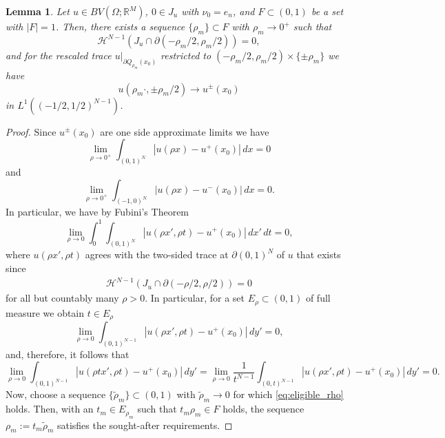 \documentclass[a4paper, 11pt, reqno]{amsart}
\theoremstyle{plain}
\newtheorem{lemma}[theorem]{Lemma}
\theoremstyle{definition}
\theoremstyle{remark}
\newcommand{\R}{\mathbb R}
\renewcommand{\H}{\mathcal H}
\begin{document}
    \begin{lemma}\label{lemma:technical_approx_limits}
        Let $u \in BV(\Omega; \R^M)$, $0 \in J_u$ with $\nu_{0} = e_n$, and $F \subset (0,1)$ be a set with $|F| = 1$. Then, there exists a sequence $\{\rho_m\} \subset F$ with $\rho_m \to 0^+$ such that 
        \[
            \H^{N-1}(J_u \cap \partial (-\rho_m/2, \rho_m/2)) = 0,
        \]
        and for the rescaled trace $u|_{\partial Q_{\rho_m}(x_0)}$ restricted to $(-\rho_m/2, \rho_m/2)\times \{\pm \rho_m\}$ we have 
        \[
            u(\rho_m \cdot, \pm \rho_m/2) \to u^\pm(x_0)
        \]
        in $L^1((-1/2, 1/2)^{N-1})$.
    \end{lemma}
    
    \begin{proof}
        Since $u^\pm(x_0)$ are one side approximate limits we have 
        \[
            \lim_{\rho \to 0^+} \int_{(0, 1)^N} |u(\rho x) - u^+(x_0)| \, dx = 0
        \]
        and
        \[
            \lim_{\rho \to 0^+} \int_{(-1, 0)^N} |u(\rho x) - u^-(x_0)| \, dx = 0.
        \]
        In particular, we have by Fubini's Theorem
        \[
            \lim_{\rho \to 0} \int_0^1 \int_{(0, 1)^{N}} |u(\rho x', \rho t) - u^+(x_0)| \, dx' \, dt= 0,
        \]
        where $u(\rho x', \rho t)$ agrees with the two-sided trace at $\partial (0,1)^N$ of $u$ that exists since 
        \begin{align}\label{eq:eligible_rho}
            \H^{N-1}(J_u \cap \partial (-\rho/2, \rho/2)) = 0
        \end{align}
        for all but countably many $\rho > 0$. In particular, for a set $E_\rho \subset (0,1)$ of full measure we obtain $t \in E_\rho$
        \[
            \lim_{\rho \to 0} \int_{(0, 1)^{N-1}} |u(\rho x', \rho t) - u^+(x_0)| \, dy' = 0,
        \]
        and, therefore, it follows that 
        \[
            \lim_{\rho \to 0} \int_{(0, 1)^{N-1}} |u(\rho t x', \rho t) - u^+(x_0)| \, dy' = \lim_{\rho \to 0} \frac1 {t^{N-1}} \int_{(0, t)^{N-1}} |u(\rho x', \rho t) - u^+(x_0)| \, dy' = 0.
        \]
        Now, choose a sequence $\{ \tilde \rho_m\} \subset (0,1)$ with $\tilde \rho_m \to 0$ for which \eqref{eq:eligible_rho} holds. Then, with an $t_m \in E_{\rho_m}$ such that $t_m\rho_m \in F$ holds, the sequence $\rho_m := t_m \tilde \rho_m$ satisfies the sought-after requirements.
    \end{proof}
    


\end{document}
